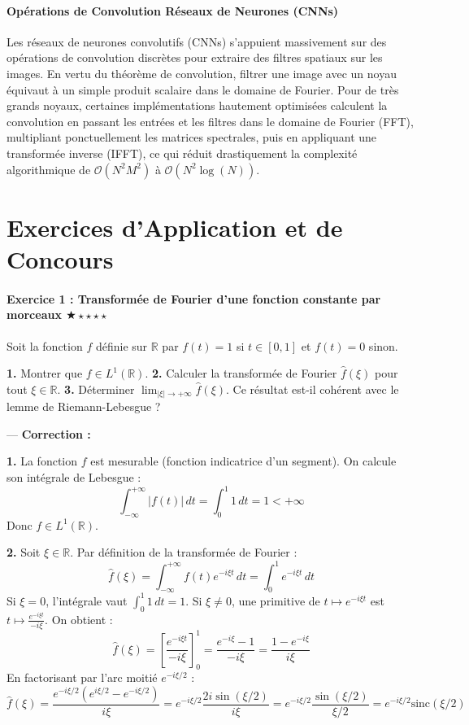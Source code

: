 \documentclass[11pt,a4paper]{article}
\begin{document}
\subsection{Opérations de Convolution Réseaux de Neurones (CNNs)}

Les réseaux de neurones convolutifs (CNNs) s'appuient massivement sur des opérations de convolution discrètes pour extraire des filtres spatiaux sur les images. En vertu du théorème de convolution, filtrer une image avec un noyau équivaut à un simple produit scalaire dans le domaine de Fourier. Pour de très grands noyaux, certaines implémentations hautement optimisées calculent la convolution en passant les entrées et les filtres dans le domaine de Fourier (FFT), multipliant ponctuellement les matrices spectrales, puis en appliquant une transformée inverse (IFFT), ce qui réduit drastiquement la complexité algorithmique de $\mathcal{O}(N^2 M^2)$ à $\mathcal{O}(N^2 \log(N))$.



\newpage
\part{Exercices d'Application et de Concours}
\subsection*{Exercice 1 : Transformée de Fourier d'une fonction constante par morceaux \quad $\bigstar\star\star\star\star$}

Soit la fonction $f$ définie sur $\mathbb{R}$ par $f(t) = 1$ si $t \in [0, 1]$ et $f(t) = 0$ sinon.

\textbf{1.} Montrer que $f \in L^1(\mathbb{R})$.
\textbf{2.} Calculer la transformée de Fourier $\hat{f}(\xi)$ pour tout $\xi \in \mathbb{R}$.
\textbf{3.} Déterminer $\lim_{|\xi| \to +\infty} \hat{f}(\xi)$. Ce résultat est-il cohérent avec le lemme de Riemann-Lebesgue ?

---
\textbf{Correction :}

\textbf{1.} La fonction $f$ est mesurable (fonction indicatrice d'un segment). On calcule son intégrale de Lebesgue :
$$ \int_{-\infty}^{+\infty} |f(t)| \, dt = \int_{0}^{1} 1 \, dt = 1 < +\infty $$
Donc $f \in L^1(\mathbb{R})$.

\textbf{2.} Soit $\xi \in \mathbb{R}$. Par définition de la transformée de Fourier :
$$ \hat{f}(\xi) = \int_{-\infty}^{+\infty} f(t)e^{-i\xi t} \, dt = \int_{0}^{1} e^{-i\xi t} \, dt $$
Si $\xi = 0$, l'intégrale vaut $\int_0^1 1 \, dt = 1$.
Si $\xi \neq 0$, une primitive de $t \mapsto e^{-i\xi t}$ est $t \mapsto \frac{e^{-i\xi t}}{-i\xi}$. On obtient :
$$ \hat{f}(\xi) = \left[ \frac{e^{-i\xi t}}{-i\xi} \right]_0^1 = \frac{e^{-i\xi} - 1}{-i\xi} = \frac{1 - e^{-i\xi}}{i\xi} $$
En factorisant par l'arc moitié $e^{-i\xi/2}$ :
$$ \hat{f}(\xi) = \frac{e^{-i\xi/2}(e^{i\xi/2} - e^{-i\xi/2})}{i\xi} = e^{-i\xi/2} \frac{2i\sin(\xi/2)}{i\xi} = e^{-i\xi/2} \frac{\sin(\xi/2)}{\xi/2} = e^{-i\xi/2} \text{sinc}(\xi/2) $$
\end{document}

